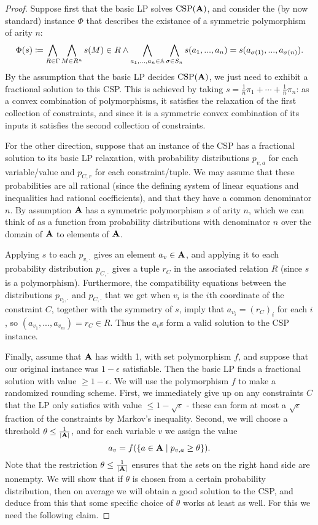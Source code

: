 \documentclass[letterpaper,11pt]{article}
\DeclareMathOperator{\CSP}{CSP}
\begin{document}
\begin{proof} Suppose first that the basic LP solves $\CSP(\fA)$, and consider the (by now standard) instance $\Phi$ that describes the existance of a symmetric polymorphism of arity $n$:
\[
\Phi(s) \coloneqq \bigwedge_{R \in \Gamma} \bigwedge_{M \in R^n} s(M) \in R \wedge \bigwedge_{a_1, ..., a_n \in \mathbb{A}} \bigwedge_{\sigma \in S_n} s(a_1, ..., a_n) = s(a_{\sigma(1)}, ..., a_{\sigma(n)}).
\]
By the assumption that the basic LP decides $\CSP(\fA)$, we just need to exhibit a fractional solution to this CSP. This is achieved by taking $s = \frac{1}{n}\pi_1 + \cdots + \frac{1}{n}\pi_n$: as a convex combination of polymorphisms, it satisfies the relaxation of the first collection of constraints, and since it is a symmetric convex combination of its inputs it satisfies the second collection of constraints.

For the other direction, suppose that an instance of the CSP has a fractional solution to its basic LP relaxation, with probability distributions $p_{v,a}$ for each variable/value and $p_{C,r}$ for each constraint/tuple. We may assume that these probabilities are all rational (since the defining system of linear equations and inequalities had rational coefficients), and that they have a common denominator $n$. By assumption $\mathbf{A}$ has a symmetric polymorphism $s$ of arity $n$, which we can think of as a function from probability distributions with denominator $n$ over the domain of $\mathbf{A}$ to elements of $\mathbf{A}$.

Applying $s$ to each $p_{v,\cdot}$ gives an element $a_v \in \mathbf{A}$, and applying it to each probability distribution $p_{C,\cdot}$ gives a tuple $r_C$ in the associated relation $R$ (since $s$ is a polymorphism). Furthermore, the compatibility equations between the distributions $p_{v_i,\cdot}$ and $p_{C,\cdot}$ that we get when $v_i$ is the $i$th coordinate of the constraint $C$, together with the symmetry of $s$, imply that $a_{v_i} = (r_C)_i$ for each $i$, so $(a_{v_1}, ..., a_{v_m}) = r_C \in R$. Thus the $a_v$s form a valid solution to the CSP instance.

Finally, assume that $\mathbf{A}$ has width 1, with set polymorphism $f$, and suppose that our original instance was $1-\epsilon$ satisfiable. Then the basic LP finds a fractional solution with value $\ge 1 - \epsilon$. We will use the polymorphism $f$ to make a randomized rounding scheme. First, we immediately give up on any constraints $C$ that the LP only satisfies with value $\le 1 - \sqrt{\epsilon}$ - these can form at most a $\sqrt{\epsilon}$ fraction of the constraints by Markov's inequality. Second, we will choose a threshold $\theta \le \frac{1}{|\mathbf{A}|}$, and for each variable $v$ we assign the value
\[
a_v = f(\{a \in \mathbf{A} \mid p_{v,a} \ge \theta\}).
\]
Note that the restriction $\theta \le \frac{1}{|\mathbf{A}|}$ ensures that the sets on the right hand side are nonempty. We will show that if $\theta$ is chosen from a certain probability distribution, then on average we will obtain a good solution to the CSP, and deduce from this that some specific choice of $\theta$ works at least as well. For this we need the following claim.


\end{proof}
\end{document}
